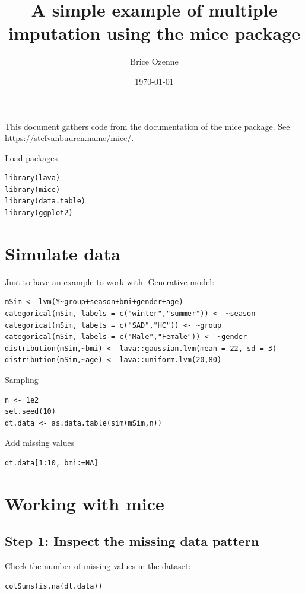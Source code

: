 \documentclass[12pt]{article}
\author{Brice Ozenne}
\date{\today}
\title{A simple example of multiple imputation using the mice package}
\begin{document}
\maketitle
This document gathers code from the documentation of the mice
package. See \url{https://stefvanbuuren.name/mice/}.

\bigskip

Load packages
\lstset{language=r,label= ,caption= ,captionpos=b,numbers=none}
\begin{lstlisting}
library(lava)
library(mice)
library(data.table)
library(ggplot2)
\end{lstlisting}

\section{Simulate data}
\label{sec:org305732f}

Just to have an example to work with. Generative model:
\lstset{language=r,label= ,caption= ,captionpos=b,numbers=none}
\begin{lstlisting}
mSim <- lvm(Y~group+season+bmi+gender+age)
categorical(mSim, labels = c("winter","summer")) <- ~season
categorical(mSim, labels = c("SAD","HC")) <- ~group
categorical(mSim, labels = c("Male","Female")) <- ~gender
distribution(mSim,~bmi) <- lava::gaussian.lvm(mean = 22, sd = 3)
distribution(mSim,~age) <- lava::uniform.lvm(20,80)
\end{lstlisting}

Sampling
\lstset{language=r,label= ,caption= ,captionpos=b,numbers=none}
\begin{lstlisting}
n <- 1e2
set.seed(10)
dt.data <- as.data.table(sim(mSim,n))
\end{lstlisting}

Add missing values
\lstset{language=r,label= ,caption= ,captionpos=b,numbers=none}
\begin{lstlisting}
dt.data[1:10, bmi:=NA]
\end{lstlisting}

\clearpage

\section{Working with mice}
\label{sec:org73980cb}

\subsection{Step 1: Inspect the missing data pattern}
\label{sec:org78ccca3}
Check the number of missing values in the dataset:
\lstset{language=r,label= ,caption= ,captionpos=b,numbers=none}
\begin{lstlisting}
colSums(is.na(dt.data))
\end{lstlisting}
\end{document}
